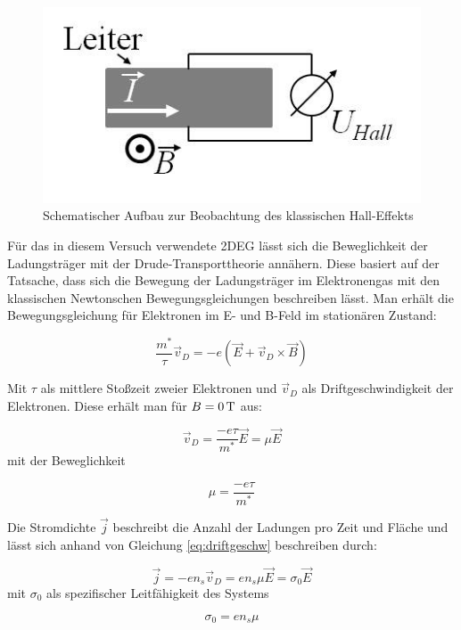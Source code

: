 \begin{figure}[h]
	\centering
	\includegraphics[width=0.4\linewidth]{images/Anleitungsheft/U_HALL_Anleitungsheft}
	\caption[Halleffekt klassisch]{Schematischer Aufbau zur Beobachtung des klassischen Hall-Effekts}
	\label{fig:U_HALL_Anleitungsheft}
\end{figure}

Für das in diesem Versuch verwendete 2DEG lässt sich die Beweglichkeit der Ladungsträger mit der Drude-Transporttheorie annähern. Diese basiert auf der Tatsache, dass sich die Bewegung der Ladungsträger im Elektronengas mit den klassischen Newtonschen Bewegungsgleichungen beschreiben lässt.
Man erhält die Bewegungsgleichung für Elektronen im E- und B-Feld im stationären Zustand:

\begin{equation}
\frac{m^*}{\tau} \vec{v}_D = -e(\vec{E}+\vec{v}_D \times \vec{B})
\label{eq:beweggl_stat}
\end{equation}

Mit $\tau$ als mittlere Stoßzeit zweier Elektronen und $\vec{v}_D$ als Driftgeschwindigkeit der Elektronen. Diese erhält man für $B=\unit[0]{T}$ aus:

\begin{equation}
\vec{v}_D=\frac{-e\tau}{m^*}\vec{E}=\mu\vec{E}
\label{eq:driftgeschw}
\end{equation}
mit der Beweglichkeit

\begin{equation}
\mu=\frac{-e\tau}{m^*}
\label{eq:bewegl_def}
\end{equation}

Die Stromdichte $\vec{j}$ beschreibt die Anzahl der Ladungen pro Zeit und Fläche und lässt sich anhand von Gleichung \ref{eq:driftgeschw} beschreiben durch:

\begin{equation}
\vec{j}=-en_s\vec{v}_D=en_s\mu\vec{E}=\sigma_0\vec{E}
\label{eq:stromdichte_herleitung}
\end{equation}
mit $\sigma_0$ als spezifischer Leitfähigkeit des Systems

\begin{equation}
\sigma_0=en_s\mu
\label{eq:sigma_def}
\end{equation}

